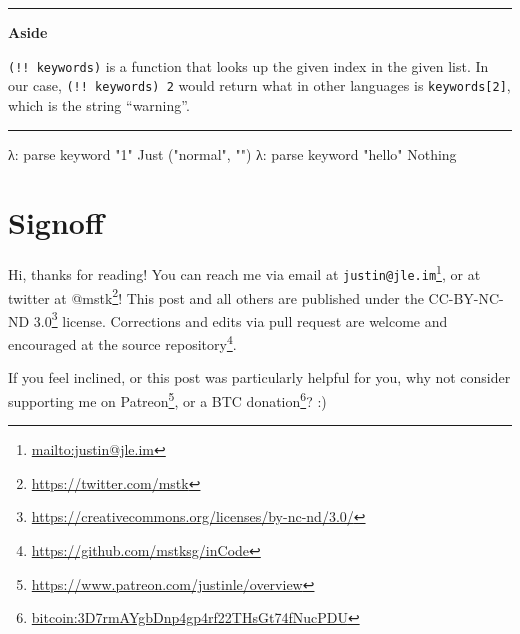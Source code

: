 \documentclass[]{article}
\newenvironment{Shaded}{}{}
\newcommand{\DataTypeTok}[1]{\textcolor[rgb]{0.56,0.13,0.00}{#1}}
\newcommand{\FunctionTok}[1]{\textcolor[rgb]{0.02,0.16,0.49}{#1}}
\newcommand{\NormalTok}[1]{#1}
\newcommand{\OperatorTok}[1]{\textcolor[rgb]{0.40,0.40,0.40}{#1}}
\newcommand{\OtherTok}[1]{\textcolor[rgb]{0.00,0.44,0.13}{#1}}
\newcommand{\StringTok}[1]{\textcolor[rgb]{0.25,0.44,0.63}{#1}}
\renewcommand{\href}[2]{#2\footnote{\url{#1}}}
\begin{document}
\begin{Shaded}
\end{Shaded}

\begin{center}\rule{0.5\linewidth}{0.5pt}\end{center}

\textbf{Aside}

\texttt{(!!\ keywords)} is a function that looks up the given index in the given
list. In our case, \texttt{(!!\ keywords)\ 2} would return what in other
languages is \texttt{keywords{[}2{]}}, which is the string ``warning''.

\begin{center}\rule{0.5\linewidth}{0.5pt}\end{center}

\begin{Shaded}
\begin{Highlighting}[]
\NormalTok{λ}\OperatorTok{:}\NormalTok{ parse keyword }\StringTok{"1"}
\DataTypeTok{Just}\NormalTok{ (}\StringTok{"normal"}\NormalTok{, }\StringTok{""}\NormalTok{)}
\NormalTok{λ}\OperatorTok{:}\NormalTok{ parse keyword }\StringTok{"hello"}
\DataTypeTok{Nothing}
\end{Highlighting}
\end{Shaded}

\section{Signoff}\label{signoff}

Hi, thanks for reading! You can reach me via email at
\href{mailto:justin@jle.im}{\nolinkurl{justin@jle.im}}, or at twitter at
\href{https://twitter.com/mstk}{@mstk}! This post and all others are published
under the \href{https://creativecommons.org/licenses/by-nc-nd/3.0/}{CC-BY-NC-ND
3.0} license. Corrections and edits via pull request are welcome and encouraged
at \href{https://github.com/mstksg/inCode}{the source repository}.

If you feel inclined, or this post was particularly helpful for you, why not
consider \href{https://www.patreon.com/justinle/overview}{supporting me on
Patreon}, or a \href{bitcoin:3D7rmAYgbDnp4gp4rf22THsGt74fNucPDU}{BTC donation}?
:)
\end{document}
